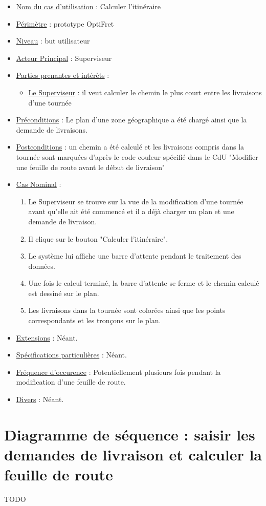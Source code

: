 \documentclass[a4paper, 10pt]{article}
\begin{document}
\begin{itemize}[label = \textbullet, font = \color{orange}]
    \item \underline{Nom du cas d'utilisation} : Calculer l'itinéraire
    \item \underline{Périmètre} : prototype OptiFret
    \item \underline{Niveau} : but utilisateur
    \item \underline{Acteur Principal} : Superviseur
    \item \underline{Parties prenantes et intérêts} :
    \begin{itemize}[label = \textbullet, font = \color{blue}]
        \item \underline{Le Superviseur} : il veut calculer le chemin le plus
            court entre les livraisons d'une tournée
    \end{itemize}
    \item \underline{Préconditions} : Le plan d'une zone géographique a été
        chargé ainsi que la demande de livraisons.
    \item \underline{Postconditions} : un chemin a été calculé et les
        livraisons compris dans la tournée sont marquées d'après le code
        couleur spécifié dans le CdU "Modifier une feuille de route avant le
        début de livraison"
    \item \underline{Cas Nominal} :
    \begin{enumerate}
        \item Le Superviseur se trouve sur la vue de la modification d'une
            tournée avant qu'elle ait été commencé et il a déjà charger un plan
            et une demande de livraison.
        \item Il clique sur le bouton "Calculer l'itinéraire".
        \item Le système lui affiche une barre d'attente pendant le traitement
            des données.
        \item Une fois le calcul terminé, la barre d'attente se ferme et le
            chemin calculé est dessiné sur le plan.
        \item Les livraisons dans la tournée sont colorées ainsi que les points
            correspondants et les tronçons sur le plan.
    \end{enumerate}
    \item \underline{Extensions} : Néant.
    \item \underline{Spécifications particulières} : Néant.
    \item \underline{Fréquence d'occurence} : Potentiellement plusieurs fois
        pendant la modification d'une feuille de route.
    \item \underline{Divers} : Néant.
\end{itemize}

\section{Diagramme de séquence : saisir les demandes de livraison et calculer la feuille de route}
{\huge TODO}

\end{document}
